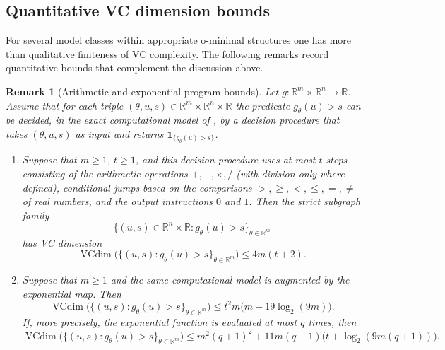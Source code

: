 \documentclass[11pt]{article}
\newtheorem{remark}[theorem]{Remark}
\begin{document}
\subsection{Quantitative VC dimension bounds}

For several model classes within appropriate o-minimal structures
one has more than qualitative finiteness of VC complexity. The following remarks record quantitative bounds that complement
the discussion above.

\begin{remark}[Arithmetic and exponential program bounds]\label{rem:AB-programs}
Let $g:\mathbb{R}^{m}\times\mathbb{R}^{n}\to\mathbb{R}$. Assume that
for each triple $(\theta,u,s)\in\mathbb{R}^{m}\times\mathbb{R}^{n}\times\mathbb{R}$
the predicate $g_{\theta}(u)>s$ can be decided, in the exact computational
model of \citet[Theorems~8.4 and~8.14]{AnthonyBartlett2009}, by a
decision procedure that takes $(\theta,u,s)$ as input and returns
$\mathbf{1}_{\{g_{\theta}(u)>s\}}$. 
\begin{enumerate}[label=(\roman*),itemsep=0.25em]
\item Suppose that $m\ge1$, $t\ge1$, and this decision procedure uses
at most $t$ steps consisting of the arithmetic operations $+,-,\times,/$
(with division only where defined), conditional jumps based on the
comparisons $>,\ge,<,\le,=,\neq$ of real numbers, and the output
instructions $0$ and $1$. Then the strict subgraph family 
\[
\bigl\{(u,s)\in\mathbb{R}^{n}\times\mathbb{R}:g_{\theta}(u)>s\bigr\}_{\theta\in\mathbb{R}^{m}}
\]
has VC dimension 
\begin{equation}
\operatorname{VCdim}\bigl(\{(u,s):g_{\theta}(u)>s\}_{\theta\in\mathbb{R}^{m}}\bigr)\le4m(t+2).\label{eq:AB-arith}
\end{equation}
\item Suppose that $m\ge1$ and the same computational model is augmented
by the exponential map. Then 
\begin{equation}
\operatorname{VCdim}\bigl(\{(u,s):g_{\theta}(u)>s\}_{\theta\in\mathbb{R}^{m}}\bigr)\le t^{2}m\bigl(m+19\log_{2}(9m)\bigr).\label{eq:AB-exp}
\end{equation}
If, more precisely, the exponential function is evaluated at most
$q$ times, then 
\begin{equation}
\operatorname{VCdim}\bigl(\{(u,s):g_{\theta}(u)>s\}_{\theta\in\mathbb{R}^{m}}\bigr)\le m^{2}(q+1)^{2}+11m(q+1)\bigl(t+\log_{2}(9m(q+1))\bigr).\label{eq:AB-exp-q}
\end{equation}
\end{enumerate}
\end{remark}
\end{document}
